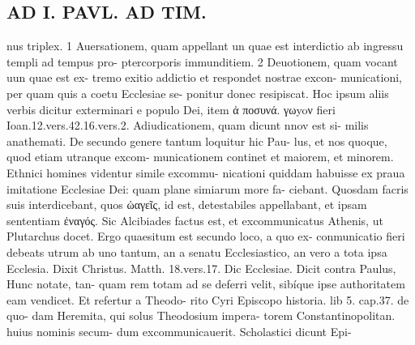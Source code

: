 \documentclass{article}
\begin{document}
\begin{pages}
\section*{AD I. PAVL. AD TIM. }
\marginpar{[ p.332 ]}nus triplex. 1 Auersationem, quam appellant un quae est interdictio ab ingressu templi ad tempus pro- ptercorporis immunditiem. 2 Deuotionem, quam vocant uun quae est ex- tremo exitio addictio et respondet nostrae excon- municationi, per quam quis a coetu Ecclesiae se- ponitur donec resipiscat. Hoc ipsum aliis verbis dicitur exterminari e populo Dei, item ἀ ποσυνά. γωyoν fieri Ioan.12.vers.42.16.vers.2. Adiudicationem, quam dicunt nnov est si- milis anathemati. De secundo genere tantum loquitur hic Pau- lus, et nos quoque, quod etiam utranque excom- municationem continet et maiorem, et minorem. Ethnici homines videntur simile excommu- nicationi quiddam habuisse ex praua imitatione Ecclesiae Dei: quam plane simiarum more fa- ciebant. Quosdam facris suis interdicebant, quos ὠαγεῖς, id est, detestabiles appellabant, et ipsam sententiam ἐναγός. Sic Alcibiades factus est, et excommunicatus Athenis, ut Plutarchus docet. Ergo quaesitum est secundo loco, a quo ex- conmunicatio fieri debeats utrum ab uno tantum, an a senatu Ecclesiastico, an vero a tota ipsa Ecclesia. Dixit Christus. Matth. 18.vers.17. Dic Ecclesiae. Dicit contra Paulus, Hunc notate, tan- quam rem totam ad se deferri velit, sibíque ipse authoritatem eam vendicet. Et refertur a Theodo- rito Cyri Episcopo historia. lib 5. cap.37. de quo- dam Heremita, qui solus Theodosium impera- torem Constantinopolitan. huius nominis secum- dum excommunicauerit. Scholastici dicunt Epi- 

\end{pages}
\end{document}
